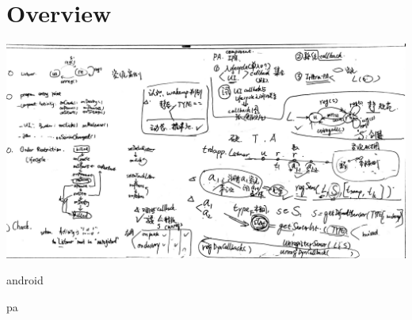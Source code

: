 \documentclass{article}
\begin{document}
\tableofcontents

\section{Overview}




\includegraphics[width=\linewidth]{img/overview_11Apr}

{android}

{pa}
\end{document}
